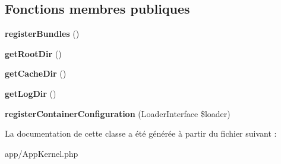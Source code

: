 \subsection*{Fonctions membres publiques}
\begin{DoxyCompactItemize}
\item 
\mbox{\label{classAppKernel_a7b5d37c914be200c1350ec7139931761}} 
{\bfseries register\+Bundles} ()
\item 
\mbox{\label{classAppKernel_a6e89dc2765c1eef6d90b59a630b47dce}} 
{\bfseries get\+Root\+Dir} ()
\item 
\mbox{\label{classAppKernel_aa25ceee5054b99a4964b443964ead6f0}} 
{\bfseries get\+Cache\+Dir} ()
\item 
\mbox{\label{classAppKernel_a6e3549c8ae2f237976c977dc21780f0c}} 
{\bfseries get\+Log\+Dir} ()
\item 
\mbox{\label{classAppKernel_a19fe2c7fcbfebedd149afd68f42475f3}} 
{\bfseries register\+Container\+Configuration} (Loader\+Interface \$loader)
\end{DoxyCompactItemize}


La documentation de cette classe a été générée à partir du fichier suivant \+:\begin{DoxyCompactItemize}
\item 
app/App\+Kernel.\+php\end{DoxyCompactItemize}
